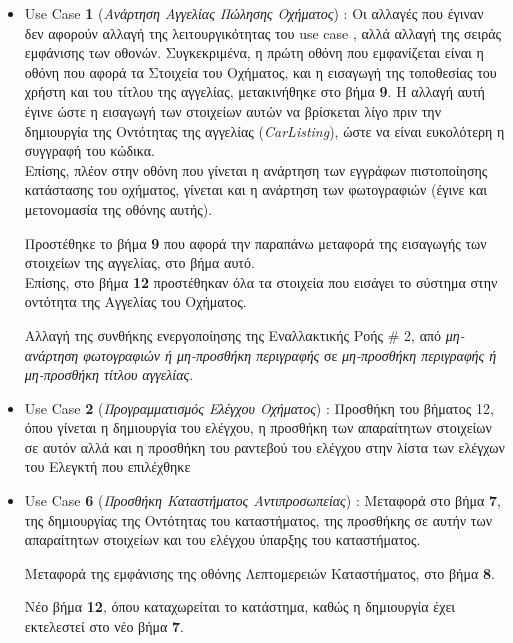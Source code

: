 \documentclass{../ol-softwaremanual}
\begin{document}
	\begin{itemize}
		\item \en Use Case \textbf{1} \gr (\textit{Ανάρτηση Αγγελίας Πώλησης Οχήματος}) : Οι αλλαγές που έγιναν δεν αφορούν αλλαγή της λειτουργικότητας του \en use case \gr, αλλά αλλαγή της σειράς εμφάνισης των οθονών. Συγκεκριμένα, η πρώτη οθόνη που εμφανίζεται είναι η οθόνη που αφορά τα Στοιχεία του Οχήματος, και η εισαγωγή της τοποθεσίας του χρήστη και του τίτλου της αγγελίας, μετακινήθηκε στο βήμα \textbf{9}. Η αλλαγή αυτή έγινε ώστε η εισαγωγή των στοιχείων αυτών να βρίσκεται λίγο πριν την δημιουργία της Οντότητας της αγγελίας (\en \textit{CarListing}\gr), ώστε να είναι ευκολότερη η συγγραφή του κώδικα. \\
		
		Επίσης, πλέον στην οθόνη που γίνεται η ανάρτηση των εγγράφων πιστοποίησης κατάστασης του οχήματος, γίνεται και η ανάρτηση των φωτογραφιών (έγινε και μετονομασία της οθόνης αυτής).
		
		Προστέθηκε το βήμα \textbf{9} που αφορά την παραπάνω μεταφορά της εισαγωγής των στοιχείων της αγγελίας, στο βήμα αυτό. \\
		
		Επίσης, στο βήμα \textbf{12} προστέθηκαν όλα τα στοιχεία που εισάγει το σύστημα στην οντότητα της Αγγελίας του Οχήματος.
		
		Αλλαγή της συνθήκης ενεργοποίησης της Εναλλακτικής Ροής \en \# 2\gr, από \textit{μη-ανάρτηση φωτογραφιών ή μη-προσθήκη περιγραφής} σε \textit{μη-προσθήκη περιγραφής ή μη-προσθήκη τίτλου αγγελίας}.
		
		\item \en Use Case \textbf{2} \gr (\textit{Προγραμματισμός Ελέγχου Οχήματος}) : Προσθήκη του βήματος 12, όπου γίνεται η δημιουργία του ελέγχου, η προσθήκη των απαραίτητων στοιχείων σε αυτόν αλλά και η προσθήκη του ραντεβού του ελέγχου στην λίστα των ελέγχων του Ελεγκτή που επιλέχθηκε 
		
		
		\item \en Use Case \textbf{6} \gr (\textit{Προσθήκη Καταστήματος Αντιπροσωπείας}) : Μεταφορά στο βήμα \textbf{7}, της δημιουργίας της Οντότητας του καταστήματος, της προσθήκης σε αυτήν των απαραίτητων στοιχείων και του ελέγχου ύπαρξης του καταστήματος. 
		
		Μεταφορά της εμφάνισης της οθόνης Λεπτομερειών Καταστήματος, στο βήμα \textbf{8}.
		
		Νέο βήμα \textbf{12}, όπου καταχωρείται το κατάστημα, καθώς η δημιουργία έχει εκτελεστεί στο νέο βήμα \textbf{7}.
		

\end{itemize}
\end{document}
